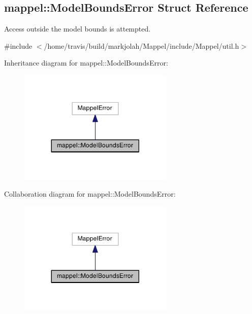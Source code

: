\hypertarget{structmappel_1_1ModelBoundsError}{}\subsection{mappel\+:\+:Model\+Bounds\+Error Struct Reference}
\label{structmappel_1_1ModelBoundsError}


Access outside the model bounds is attempted.  




{\ttfamily \#include $<$/home/travis/build/markjolah/\+Mappel/include/\+Mappel/util.\+h$>$}



Inheritance diagram for mappel\+:\+:Model\+Bounds\+Error\+:\nopagebreak
\begin{figure}[H]
\begin{center}
\leavevmode
\includegraphics[width=209pt]{structmappel_1_1ModelBoundsError__inherit__graph}
\end{center}
\end{figure}


Collaboration diagram for mappel\+:\+:Model\+Bounds\+Error\+:\nopagebreak
\begin{figure}[H]
\begin{center}
\leavevmode
\includegraphics[width=209pt]{structmappel_1_1ModelBoundsError__coll__graph}
\end{center}
\end{figure}
